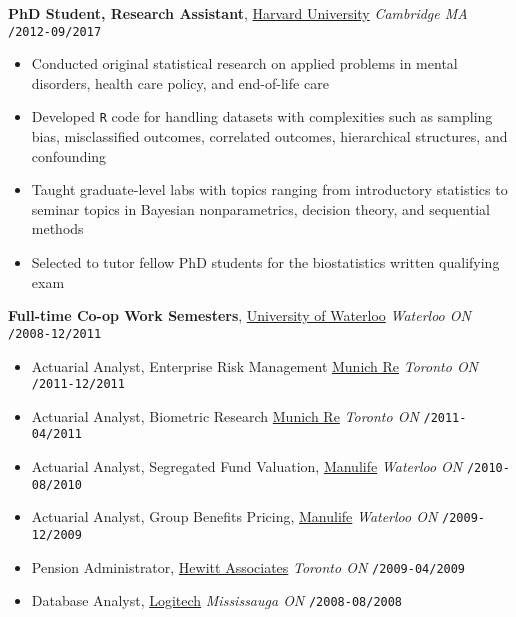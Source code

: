 \documentclass[10pt,english]{report}
\begin{document}
\vspace{1mm}

\textbf{PhD Student, Research Assistant}, \textcolor{blue}{\href{https://gsas.harvard.edu/programs-of-study/all/biostatistics}{Harvard University}} \hfill \textit{Cambridge MA} \texttt{/2012-09/2017}
\begin{itemize}
\item Conducted original statistical research on applied problems in mental disorders, health care policy, and end-of-life care
\item Developed \texttt{R} code for handling datasets with complexities such as sampling bias, misclassified outcomes, correlated outcomes, hierarchical structures, and confounding
\item Taught graduate-level labs with topics ranging from introductory statistics to seminar topics in Bayesian nonparametrics, decision theory, and sequential methods
\item Selected to tutor fellow PhD students for the biostatistics written qualifying exam
\end{itemize}

\vspace{1mm}

\textbf{Full-time Co-op Work Semesters}, \textcolor{blue}{\href{https://uwaterloo.ca/math/}{University of Waterloo}} \hfill \textit{Waterloo ON} \texttt{/2008-12/2011}
\begin{itemize}
\item Actuarial Analyst, Enterprise Risk Management \textcolor{blue}{\href{https://www.munichre.com/ca}{Munich Re}} \hfill \textit{Toronto ON} \texttt{/2011-12/2011}
\item Actuarial Analyst, Biometric Research \textcolor{blue}{\href{https://www.munichre.com/ca}{Munich Re}} \hfill \textit{Toronto ON} \texttt{/2011-04/2011}
\item Actuarial Analyst, Segregated Fund Valuation, \textcolor{blue}{\href{https://www.manulife.ca}{Manulife}} \hfill \textit{Waterloo ON} \texttt{/2010-08/2010}
\item Actuarial Analyst, Group Benefits Pricing, \textcolor{blue}{\href{https://www.manulife.ca}{Manulife}} \hfill \textit{Waterloo ON} \texttt{/2009-12/2009}
\item Pension Administrator, \textcolor{blue}{\href{http://www.aonhewitt.com}{Hewitt Associates}} \hfill \textit{Toronto ON} \texttt{/2009-04/2009}
\item Database Analyst, \textcolor{blue}{\href{https://www.logitech.com/en-ca}{Logitech}} \hfill \textit{Mississauga ON} \texttt{/2008-08/2008}
\end{itemize}
\end{document}
